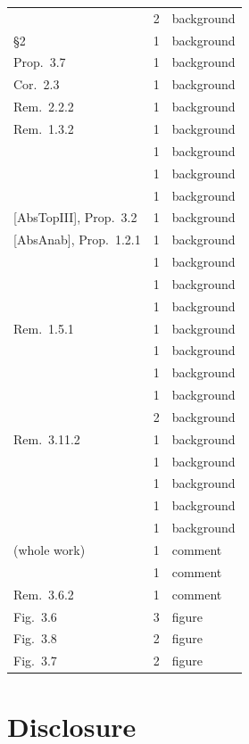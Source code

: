 \documentclass[11pt]{article}
\theoremstyle{plain}
\theoremstyle{definition}
\theoremstyle{remark}
\begin{document}
\begin{longtable}{lrl}
\cite[Cor.~3.6]{IUT2} & 2 & background \\
\S 2 & 1 & background \\
Prop.~3.7 & 1 & background \\
Cor.~2.3 & 1 & background \\
Rem.~2.2.2 & 1 & background \\
Rem.~1.3.2 & 1 & background \\
\cite[Cor.~1.11]{IUT2} & 1 & background \\
\cite[Rem.~1.11.1]{IUT2} & 1 & background \\
\cite[Prop.~4.2]{IUT2} & 1 & background \\
{[AbsTopIII]}, Prop.~3.2 & 1 & background \\
{[AbsAnab]}, Prop.~1.2.1 & 1 & background \\
\cite[Prop.~4.4]{IUT2} & 1 & background \\
\cite[Rem.~3.4.2]{IUT1} & 1 & background \\
\cite[Rem.~1.11.3]{IUT2} & 1 & background \\
Rem.~1.5.1 & 1 & background \\
\cite[\S 4]{IUT1} & 1 & background \\
\cite[\S 5]{IUT1} & 1 & background \\
\cite[\S 6]{IUT1} & 1 & background \\
\cite[Rem.~4.7.6]{IUT2} & 2 & background \\
Rem.~3.11.2 & 1 & background \\
\cite[\S 2]{IUT2} & 1 & background \\
\cite[\S 2]{IUT1} & 1 & background \\
\cite[Rem.~6.12.4]{IUT1} & 1 & background \\
\cite[Rem.~4.5.3]{IUT2} & 1 & background \\
\cite{IUT4} (whole work) & 1 & comment \\
\cite[Rem.~2.3.2]{IUT4} & 1 & comment \\
Rem.~3.6.2 & 1 & comment \\
Fig.~3.6 & 3 & figure \\
Fig.~3.8 & 2 & figure \\
Fig.~3.7 & 2 & figure \\
\bottomrule
\end{longtable}

\section*{Disclosure}
\end{document}
